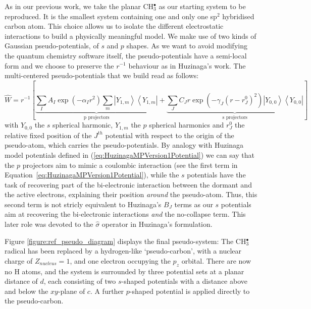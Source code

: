 \documentclass[12pt]{article}
\begin{document}
As in our previous work\cite{drujon_pseudopotentials_2013},
we take the planar CH\(^{\bullet}_{3}\) as our starting system to be reproduced.
It is the smallest system containing one and only one sp$^2$ hybridised carbon atom. This choice allows us to isolate the different electrostatic interactions to build a physically meaningful model. We make use of two kinds of Gaussian pseudo-potentials, \cite{me_structure_theory} of \(s\) and \(p\) shapes. As we want to avoid modifying the quantum chemistry software itself, the pseudo-potentials have a semi-local form and we choose to preserve the \(r^{-1}\) behaviour as in Huzinaga's work.
The multi-centered pseudo-potentials that we build read as follows:
\begin{equation}
\label{eq:ourPP}
\hat{W} = r^{-1}\left[%
\underbrace{\sum_IA_I\exp(-\alpha_I r^2)\sum_m\left|Y_{1,m}\right>\left<Y_{1,m}\right|}_{\text{p projectors}}%
+%
\underbrace{\sum_JC_Jr\exp(-\gamma_J (r-r^0_J)^2)\left|Y_{0,0}\right>\left<Y_{0,0}\right|}_{\text{s projectors}}%
\right]
\end{equation}
with $Y_{0,0}$ the $s$ spherical harmonic, $Y_{1,m}$ the $p$ spherical harmonics and $r^0_J$ the relative fixed position of the $J^{th}$ potential with respect to the origin of the pseudo-atom, which carries the pseudo-potentials.
By analogy with Huzinaga model potentials defined in (\ref{eq:HuzinagaMPVersion1Potential})
we can say that the $p$ projectors aim to mimic a coulombic interaction (see the first term in Equation~\ref{eq:HuzinagaMPVersion1Potential}),
while the $s$ potentials have the task of recovering part of the bi-electronic interaction
between the dormant and the active electrons, explaining their position \textit{around} the pseudo-atom.
Thus, this second term is not stricly equivalent to Huzinaga's $B_J$ terms as our $s$ potentials aim at recovering
the bi-electronic interactions \textit{and} the no-collapse term.
This later role was devoted to the $\hat{\sigma}$ operator in Huzinaga's formulation.

Figure \ref{figure:ref_pseudo_diagram} displays the final pseudo-system: The CH\(^{\bullet}_{3}\) radical has been replaced by a hydrogen-like `pseudo-carbon', with a nuclear charge of \(Z_{nucleus} = 1\), and one electron occupying the \(p_{z}\) orbital. 
There are now no H atoms, and the system is surrounded by three potential sets at a planar distance of \(d\), each consisting of 
two \(s\)-shaped potentials with a distance above and below the \(xy\)-plane of \(c\). A further \(p\)-shaped potential is applied
directly to the pseudo-carbon.
\end{document}
